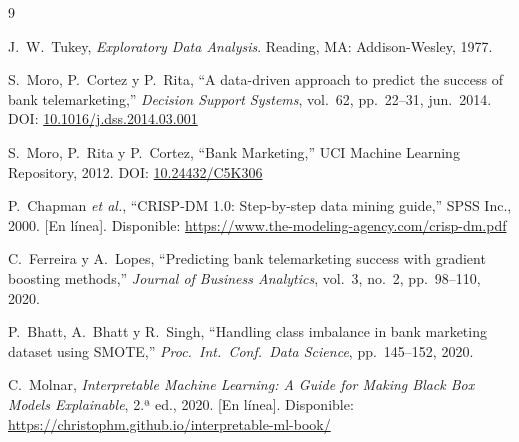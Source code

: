 \documentclass[conference]{IEEEtran}
\begin{document}
\begin{thebibliography}{9}

J.\ W.\ Tukey,
\textit{Exploratory Data Analysis}.
Reading, MA: Addison-Wesley, 1977.

S.\ Moro, P.\ Cortez y P.\ Rita,
``A data-driven approach to predict the success of bank telemarketing,''
\textit{Decision Support Systems}, vol.\ 62, pp.\ 22--31, jun.\ 2014.
DOI: \href{https://doi.org/10.1016/j.dss.2014.03.001}{10.1016/j.dss.2014.03.001}

S.\ Moro, P.\ Rita y P.\ Cortez,
``Bank Marketing,'' UCI Machine Learning Repository, 2012.
DOI: \href{https://doi.org/10.24432/C5K306}{10.24432/C5K306}

P.\ Chapman \textit{et al.},
``CRISP-DM 1.0: Step-by-step data mining guide,''
SPSS Inc., 2000.
[En línea]. Disponible: \url{https://www.the-modeling-agency.com/crisp-dm.pdf}

C.\ Ferreira y A.\ Lopes,
``Predicting bank telemarketing success with gradient boosting methods,''
\textit{Journal of Business Analytics}, vol.\ 3, no.\ 2, pp.\ 98--110, 2020.

P.\ Bhatt, A.\ Bhatt y R.\ Singh,
``Handling class imbalance in bank marketing dataset using SMOTE,''
\textit{Proc.\ Int.\ Conf.\ Data Science}, pp.\ 145--152, 2020.

C.\ Molnar,
\textit{Interpretable Machine Learning: A Guide for Making Black Box Models Explainable},
2.ª ed., 2020.
[En línea]. Disponible: \url{https://christophm.github.io/interpretable-ml-book/}

\end{thebibliography}
\end{document}
